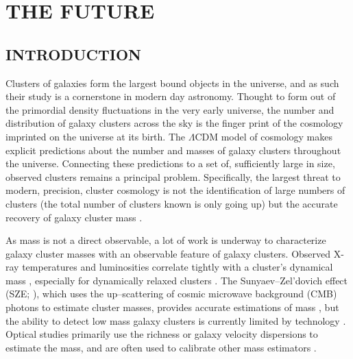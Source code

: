 %
%
%



\renewcommand*{\thefootnote}{\fnsymbol{footnote}}
\chapter[The Future]{\uppercase {The Future} }
\renewcommand*{\thefootnote}{\arabic{footnote}}
\setcounter{footnote}{0}

\section{INTRODUCTION} Clusters of galaxies form the largest bound objects in the universe, and as such their study is a cornerstone in modern day astronomy. Thought to form out of the primordial density fluctuations in the very early universe, the number and distribution of galaxy clusters across the sky is the finger print of the cosmology imprinted on the universe at its birth. The $\Lambda$CDM model of cosmology makes explicit predictions about the number and masses of galaxy clusters throughout the universe. Connecting these predictions to a set of, sufficiently large in size, observed clusters remains a principal problem. Specifically, the largest threat to modern, precision, cluster cosmology is not the identification of large numbers of clusters (the total number of clusters known is only going up) but the accurate recovery of galaxy cluster mass . 

As mass is not a direct observable, a lot of work is underway to characterize galaxy cluster masses with an observable feature of galaxy clusters. Observed X-ray temperatures and luminosities correlate tightly with a cluster's dynamical mass , especially for dynamically relaxed clusters . The Sunyaev--Zel'dovich effect (SZE; \citealt{Sunyaev1972}), which uses the up--scattering of cosmic microwave background (CMB) photons to estimate cluster masses, provides accurate estimations of mass , but the ability to detect low mass galaxy clusters is currently limited by technology . Optical studies  primarily use the richness  or galaxy velocity dispersions to estimate the mass, and are often used to calibrate other mass estimators . 

